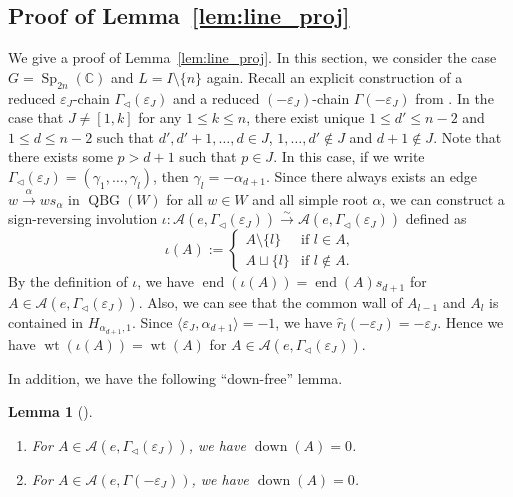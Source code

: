 \documentclass[a4paper, 11pt, reqno]{amsart}
\numberwithin{equation}{section}
\newcommand{\BC}{\mathbb{C}}
\newcommand{\CA}{\mathcal{A}}
\newcommand{\ve}{\varepsilon}
\newcommand{\vtl}{\vartriangleleft}
\newcommand{\Sp}[1]{\operatorname{Sp}_{#1}(\BC)}
\newcommand{\wh}[1]{\widehat{#1}}
\newcommand{\pair}[2]{\langle #1, #2 \rangle}
\DeclareMathOperator{\ed}{end}
\DeclareMathOperator{\down}{down}
\DeclareMathOperator{\wt}{wt}
\DeclareMathOperator{\QBG}{QBG}
\theoremstyle{plain}
\newtheorem{lem}[thm]{Lemma}
\theoremstyle{definition}
\theoremstyle{remark}
\newenvironment{enu}{%
\begin{enumerate}[label=\textup{(\arabic*)}, left=0pt]}{%
\end{enumerate}}
\begin{document}
\subsection{Proof of Lemma~\ref{lem:line_proj}}
We give a proof of Lemma~\ref{lem:line_proj}. In this section, we consider the case $G = \Sp{2n}$ and $L = I \setminus \{n\}$ again. 
Recall an explicit construction of a reduced $\ve_{J}$-chain $\Gamma_{\vtl}(\ve_{J})$ and a reduced $(-\ve_{J})$-chain $\Gamma(-\ve_{J})$ from \cite[Section~A.2]{Kouno}. 
In the case that $J \not= [1, k]$ for any $1 \le k \le n$, there exist unique $1 \le d' \le n-2$ and $1 \le d \le n-2$ such that $d', d'+1, \ldots, d \in J$, $1, \ldots, d' \notin J$ and $d+1 \notin J$. Note that there exists some $p > d+1$ such that $p \in J$. In this case, if we write $\Gamma_{\vtl}(\ve_{J}) = (\gamma_{1}, \ldots, \gamma_{l})$, then $\gamma_{l} = -\alpha_{d+1}$. 
Since there always exists an edge $w \xrightarrow{\alpha} ws_{\alpha}$ in $\QBG(W)$ for all $w \in W$ and all simple root $\alpha$, we can construct a sign-reversing involution $\iota: \CA(e, \Gamma_{\vtl}(\ve_{J})) \xrightarrow{\sim} \CA(e, \Gamma_{\vtl}(\ve_{J}))$ defined as
\begin{equation}
\iota(A) := \begin{cases} A \setminus \{l\} & \text{if $l \in A$,} \\ A \sqcup \{l\} & \text{if $l \notin A$.} \end{cases}
\end{equation}
By the definition of $\iota$, we have $\ed(\iota(A)) = \ed(A) s_{d+1}$ for $A \in \CA(e, \Gamma_{\vtl}(\ve_{J}))$. 
Also, we can see that the common wall of $A_{l-1}$ and $A_{l}$ is contained in $H_{\alpha_{d+1}, 1}$. Since $\pair{\ve_{J}}{\alpha_{d+1}} = -1$, we have $\wh{r}_{l}(-\ve_{J}) = -\ve_{J}$. Hence we have $\wt(\iota(A)) = \wt(A)$ for $A \in \CA(e, \Gamma_{\vtl}(\ve_{J}))$. 

In addition, we have the following ``down-free'' lemma. 
\begin{lem}[{\cite[Proposition~A.3]{Kouno}}] \label{lem:down-free}
\begin{enu}
\item For $A \in \CA(e, \Gamma_{\vtl}(\ve_{J}))$, we have $\down(A) = 0$. 
\item For $A \in \CA(e, \Gamma(-\ve_{J}))$, we have $\down(A) = 0$. 
\end{enu}
\end{lem}
\end{document}
